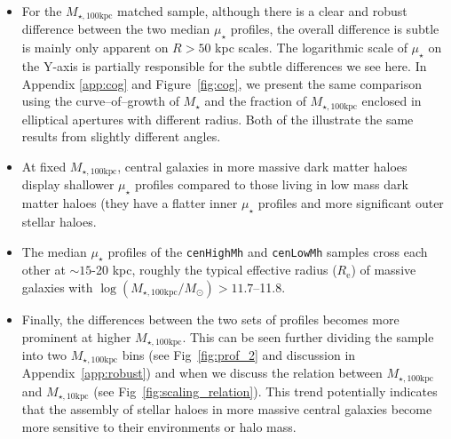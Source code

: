 \documentclass[a4paper,fleqn,usenatbib]{mnras}
\def\rbcg{\texttt{cenHighMh}}
\def\nbcg{\texttt{cenLowMh}}
\def\mstar{{$M_{\star}$}}
\def\minn{{$M_{\star,10\mathrm{kpc}}$}}
\def\mtot{{$M_{\star,100\mathrm{kpc}}$}}
\def\logmtot{{$\log (M_{\star,100\mathrm{kpc}}/M_{\odot})$}}
\def\mden{{$\mu_{\star}$}}
\begin{document}
    \begin{itemize}
        
        \item For the \mtot{} matched sample, although there is a clear and robust 
            difference between the two median \mden{} profiles, the overall difference 
            is subtle is mainly only apparent on $R>50$ kpc scales. 
            The logarithmic scale of \mden{} on the Y-axis is partially responsible 
            for the subtle differences we see here.  
            In Appendix \ref{app:cog} and Figure~\ref{fig:cog}, we present the same
            comparison using the curve--of--growth of \mstar{} and the fraction of 
            \mtot{} enclosed in elliptical apertures with different radius. 
            Both of the illustrate the same results from slightly different angles. 
            
        \item At fixed \mtot{}, central galaxies in more massive dark matter haloes 
            display shallower \mden{} profiles compared to those living in low mass 
            dark matter haloes (they have a flatter inner \mden{} profiles and 
            more significant outer stellar haloes. 
            
        \item The median \mden{} profiles of the \rbcg{} and \nbcg{} samples cross 
            each other at ${\sim} 15$-20 kpc, roughly the typical effective radius 
            ($R_{\mathrm{e}}$) of massive galaxies with \logmtot{}$>11.7$--11.8.      
            
        \item Finally, the differences between the two sets of profiles becomes 
            more prominent at higher \mtot{}. 
            This can be seen further dividing the sample into two \mtot{} bins 
            (see Fig~\ref{fig:prof_2} and discussion in Appendix~\ref{app:robust}) 
            and when we discuss the relation between \mtot{} and 
            \minn{} (see Fig~\ref{fig:scaling_relation}). 
            This trend potentially indicates that the assembly of stellar haloes in 
            more massive central galaxies become more sensitive to their 
            environments or halo mass. 
            
    \end{itemize}

    
\end{document}
